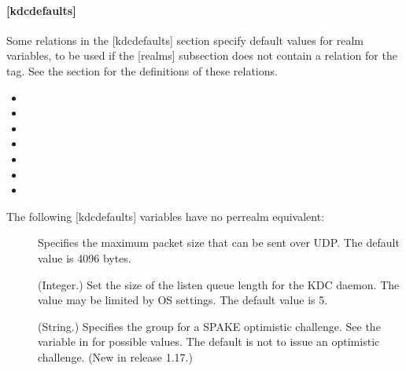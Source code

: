 \documentclass[letterpaper,10pt,english]{sphinxmanual}
\begin{document}
\paragraph{{[}kdcdefaults{]}}
\label{\detokenize{admin/conf_files/kdc_conf:kdcdefaults}}\label{\detokenize{admin/conf_files/kdc_conf:id1}}
\sphinxAtStartPar
Some relations in the {[}kdcdefaults{]} section specify default values for
realm variables, to be used if the {[}realms{]} subsection does not
contain a relation for the tag.  See the {\hyperref[\detokenize{admin/conf_files/kdc_conf:kdc-realms}]{}} section for
the definitions of these relations.
\begin{itemize}
\item {} 
\sphinxAtStartPar
{}

\item {} 
\sphinxAtStartPar
{}

\item {} 
\sphinxAtStartPar
{}

\item {} 
\sphinxAtStartPar
{}

\item {} 
\sphinxAtStartPar
{}

\item {} 
\sphinxAtStartPar
{}

\item {} 
\sphinxAtStartPar
{}

\end{itemize}

\sphinxAtStartPar
The following {[}kdcdefaults{]} variables have no per\sphinxhyphen{}realm equivalent:
\begin{description}
\item[{}] \leavevmode
\sphinxAtStartPar
Specifies the maximum packet size that can be sent over UDP.  The
default value is 4096 bytes.

\item[{}] \leavevmode
\sphinxAtStartPar
(Integer.)  Set the size of the listen queue length for the KDC
daemon.  The value may be limited by OS settings.  The default
value is 5.

\item[{}] \leavevmode
\sphinxAtStartPar
(String.)  Specifies the group for a SPAKE optimistic challenge.
See the  variable in {\hyperref[\detokenize{admin/conf_files/krb5_conf:libdefaults}]{}}
for possible values.  The default is not to issue an optimistic
challenge.  (New in release 1.17.)

\end{description}
\end{document}
